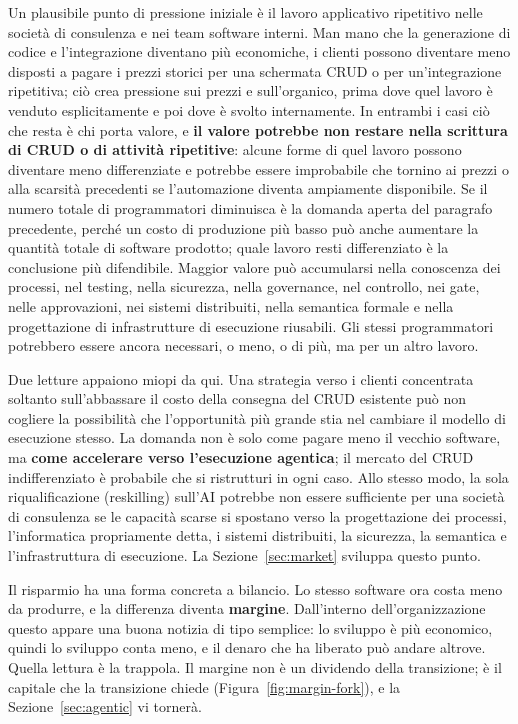 \documentclass[10pt,oneside,openany]{book}
\begin{document}
\begin{notebox}
Un plausibile punto di pressione iniziale è il lavoro applicativo ripetitivo nelle società di consulenza e nei team software interni. Man mano che la generazione di codice e l'integrazione diventano più economiche, i clienti possono diventare meno disposti a pagare i prezzi storici per una schermata CRUD o per un'integrazione ripetitiva; ciò crea pressione sui prezzi e sull'organico, prima dove quel lavoro è venduto esplicitamente e poi dove è svolto internamente. In entrambi i casi ciò che resta è chi porta valore, e \textbf{il valore potrebbe non restare nella scrittura di CRUD o di attività ripetitive}: alcune forme di quel lavoro possono diventare meno differenziate e potrebbe essere improbabile che tornino ai prezzi o alla scarsità precedenti se l'automazione diventa ampiamente disponibile. Se il numero totale di programmatori diminuisca è la domanda aperta del paragrafo precedente, perché un costo di produzione più basso può anche aumentare la quantità totale di software prodotto; quale lavoro resti differenziato è la conclusione più difendibile. Maggior valore può accumularsi nella conoscenza dei processi, nel testing, nella sicurezza, nella governance, nel controllo, nei gate, nelle approvazioni, nei sistemi distribuiti, nella semantica formale e nella progettazione di infrastrutture di esecuzione riusabili. Gli stessi programmatori potrebbero essere ancora necessari, o meno, o di più, ma per un altro lavoro.

Due letture appaiono miopi da qui. Una strategia verso i clienti concentrata soltanto sull'abbassare il costo della consegna del CRUD esistente può non cogliere la possibilità che l'opportunità più grande stia nel cambiare il modello di esecuzione stesso. La domanda non è solo come pagare meno il vecchio software, ma \textbf{come accelerare verso l'esecuzione agentica}; il mercato del CRUD indifferenziato è probabile che si ristrutturi in ogni caso. Allo stesso modo, la sola riqualificazione (reskilling) sull'AI potrebbe non essere sufficiente per una società di consulenza se le capacità scarse si spostano verso la progettazione dei processi, l'informatica propriamente detta, i sistemi distribuiti, la sicurezza, la semantica e l'infrastruttura di esecuzione. La Sezione~\ref{sec:market} sviluppa questo punto.
\end{notebox}

Il risparmio ha una forma concreta a bilancio. Lo stesso software ora costa meno da produrre, e la differenza diventa \textbf{margine}. Dall'interno dell'organizzazione questo appare una buona notizia di tipo semplice: lo sviluppo è più economico, quindi lo sviluppo conta meno, e il denaro che ha liberato può andare altrove. Quella lettura è la trappola. Il margine non è un dividendo della transizione; è il capitale che la transizione chiede (Figura~\ref{fig:margin-fork}), e la Sezione~\ref{sec:agentic} vi tornerà.
\end{document}
